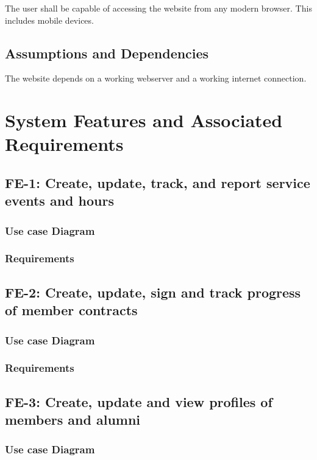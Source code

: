 \documentclass{article}
\begin{document}
The user shall be capable of accessing the website from any modern
browser. This includes mobile devices.

\subsection{Assumptions and Dependencies}

The website depends on a working webserver and a working internet
connection.

\section{System Features and Associated Requirements}

\subsection{FE-1: Create, update, track, and report service events and
  hours}

\subsubsection{Use case Diagram}

\subsubsection{Requirements}

\subsection{FE-2: Create, update, sign and track progress of member
  contracts}

\subsubsection{Use case Diagram}

\subsubsection{Requirements}

\subsection{FE-3: Create, update and view profiles of members and
  alumni}

\subsubsection{Use case Diagram}
\end{document}
